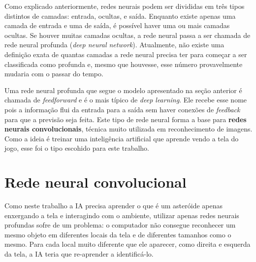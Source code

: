 Como explicado anteriormente, redes neurais podem ser divididas em três tipos distintos de camadas: entrada, ocultas, e saída. Enquanto existe apenas uma camada de entrada e uma de saída, é possível haver uma ou mais camadas ocultas. Se houver muitas camadas ocultas, a rede neural passa a ser chamada de rede neural profunda (\textit{deep neural network}). Atualmente, não existe uma definição exata de quantas camadas a rede neural precisa ter para começar a ser classificada como profunda e, mesmo que houvesse, esse número provavelmente mudaria com o passar do tempo.

Uma rede neural profunda que segue o modelo apresentado na seção anterior é chamada de \textit{feedforward} e é o mais típico de \textit{deep learning}. Ele recebe esse nome pois a informação flui da entrada para a saída sem haver conexões de \textit{feedback} para que a previsão seja feita. Este tipo de rede neural forma a base para \textbf{redes neurais convolucionais}, técnica muito utilizada em reconhecimento de imagens. Como a ideia é treinar uma inteligência artificial que aprende vendo a tela do jogo, esse foi o tipo escohido para este trabalho.


\section{Rede neural convolucional}
\label{sec:cnn}

Como neste trabalho a IA precisa aprender o que é um asteróide apenas enxergando a tela e interagindo com o ambiente, utilizar apenas redes neurais profundas sofre de um problema: o computador não consegue reconhecer um mesmo objeto em diferentes locais da tela e de diferentes tamanhos como o mesmo. Para cada local muito diferente que ele aparecer, como direita e esquerda da tela, a IA teria que re-aprender a identificá-lo.

